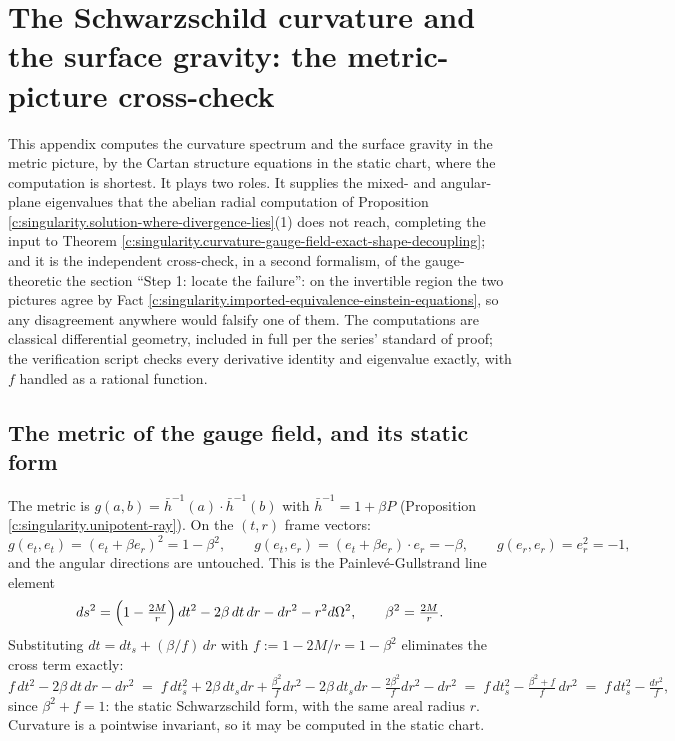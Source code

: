 \documentclass[11pt]{article}
\theoremstyle{definition}
\theoremstyle{plain}
\providecommand{\er}{}\renewcommand{\er}{e_r}
\providecommand{\et}{}\renewcommand{\et}{e_t}
\providecommand{\hb}{}\renewcommand{\hb}{\bar{h}}
\begin{document}
\section{The Schwarzschild curvature and the surface gravity: the metric-picture cross-check}

\label{c:note.singularity.setting-schwarzschild-curvature-surface-gravity-metric}
This appendix computes the curvature spectrum and the surface gravity in the metric picture, by the Cartan structure equations in the static chart, where the computation is shortest. It plays two roles. It supplies the mixed- and angular-plane eigenvalues that the abelian radial computation of Proposition \ref{c:singularity.solution-where-divergence-lies}(1) does not reach, completing the input to Theorem \ref{c:singularity.curvature-gauge-field-exact-shape-decoupling}; and it is the independent cross-check, in a second formalism, of the gauge-theoretic the section ``Step 1: locate the failure'': on the invertible region the two pictures agree by Fact \ref{c:singularity.imported-equivalence-einstein-equations}, so any disagreement anywhere would falsify one of them. The computations are classical differential geometry, included in full per the series' standard of proof; the verification script checks every derivative identity and eigenvalue exactly, with $f$ handled as a rational function.

\subsection*{The metric of the gauge field, and its static form}
\label{c:note.singularity.setting-metric-gauge-field-static-form}
The metric is $g(a,b) = \hb^{-1}(a) \cdot \hb^{-1}(b)$ with $\hb^{-1} = 1 + \beta P$ (Proposition \ref{c:singularity.unipotent-ray}). On the $(t,r)$ frame vectors:
\[
g(\et, \et) = (\et + \beta\er)^2 = 1 - \beta^2, \qquad
g(\et, \er) = (\et + \beta\er)\cdot\er = -\beta, \qquad
g(\er, \er) = \er^2 = -1 ,
\]
and the angular directions are untouched. This is the Painlev\'e-Gullstrand line element
\[
ds^2 = \Bigl(1 - \tfrac{2M}{r}\Bigr)\,dt^2 - 2\beta\,dt\,dr - dr^2 - r^2 d\Omega^2 , \qquad \beta^2 = \tfrac{2M}{r} .
\]
Substituting $dt = dt_s + (\beta/f)\,dr$ with $f := 1 - 2M/r = 1 - \beta^2$ eliminates the cross term exactly:
\[
f\,dt^2 - 2\beta\,dt\,dr - dr^2
\;=\; f\,dt_s^2 + 2\beta\,dt_s dr + \tfrac{\beta^2}{f}dr^2 - 2\beta\,dt_s dr - \tfrac{2\beta^2}{f}dr^2 - dr^2
\;=\; f\,dt_s^2 - \tfrac{\beta^2 + f}{f}\,dr^2
\;=\; f\,dt_s^2 - \tfrac{dr^2}{f} ,
\]
since $\beta^2 + f = 1$: the static Schwarzschild form, with the same areal radius $r$. Curvature is a pointwise invariant, so it may be computed in the static chart.
\end{document}
